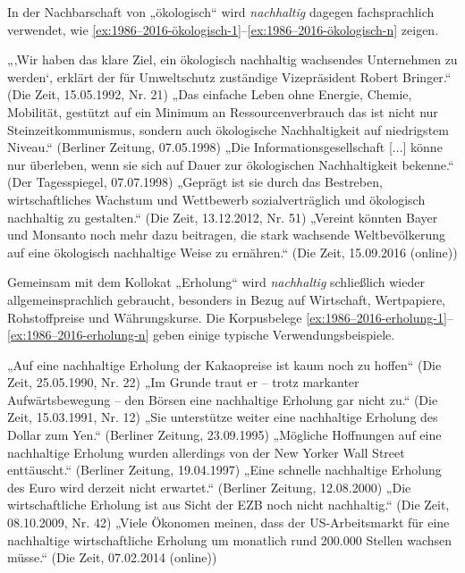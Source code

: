 \documentclass[
    german,
    a4paper,%
    12pt,%
    oneside,%
    toc=bibliography,
    final,
]{scrartcl}
\begin{document}
In der Nachbarschaft von „ökologisch“ wird \textit{nachhaltig} dagegen fachsprachlich verwendet, wie \ref{ex:1986–2016-ökologisch-1}–\ref{ex:1986–2016-ökologisch-n} zeigen.

\begin{exe}
\ex\label{ex:1986–2016-ökologisch-1} „‚Wir haben das klare Ziel, ein ökologisch nachhaltig wachsendes Unternehmen zu werden‘, erklärt der für Umweltschutz zuständige Vizepräsident Robert Bringer.“ (Die Zeit, 15.05.1992, Nr. 21)
\ex „Das einfache Leben ohne Energie, Chemie, Mobilität, gestützt auf ein Minimum an Ressourcenverbrauch das ist nicht nur Steinzeitkommunismus, sondern auch ökologische Nachhaltigkeit auf niedrigstem Niveau.“ (Berliner Zeitung, 07.05.1998)
\ex „Die Informationsgesellschaft [...] könne nur überleben, wenn sie sich auf Dauer zur ökologischen Nachhaltigkeit bekenne.“ (Der Tagesspiegel, 07.07.1998)
\ex „Geprägt ist sie durch das Bestreben, wirtschaftliches Wachstum und Wettbewerb sozialverträglich und ökologisch nachhaltig zu gestalten.“ (Die Zeit, 13.12.2012, Nr. 51)
\ex\label{ex:1986–2016-ökologisch-n} „Vereint könnten Bayer und Monsanto noch mehr dazu beitragen, die stark wachsende Weltbevölkerung auf eine ökologisch nachhaltige Weise zu ernähren.“ (Die Zeit, 15.09.2016 (online))
\end{exe}

Gemeinsam mit dem Kollokat „Erholung“ wird \textit{nachhaltig} schließlich wieder allgemeinsprachlich gebraucht, besonders in Bezug auf Wirtschaft, Wertpapiere, Rohstoffpreise und Währungskurse. Die Korpusbelege \ref{ex:1986–2016-erholung-1}–\ref{ex:1986–2016-erholung-n} geben einige typische Verwendungsbeispiele.

\begin{exe}
\ex\label{ex:1986–2016-erholung-1} „Auf eine nachhaltige Erholung der Kakaopreise ist kaum noch zu hoffen“ (Die Zeit, 25.05.1990, Nr. 22)
\ex „Im Grunde traut er – trotz markanter Aufwärtsbewegung – den Börsen eine nachhaltige Erholung gar nicht zu.“ (Die Zeit, 15.03.1991, Nr. 12)
\ex „Sie unterstütze weiter eine nachhaltige Erholung des Dollar zum Yen.“ (Berliner Zeitung, 23.09.1995)
\ex „Mögliche Hoffnungen auf eine nachhaltige Erholung wurden allerdings von der New Yorker Wall Street enttäuscht.“ (Berliner Zeitung, 19.04.1997)
\ex „Eine schnelle nachhaltige Erholung des Euro wird derzeit nicht erwartet.“ (Berliner Zeitung, 12.08.2000)
\ex „Die wirtschaftliche Erholung ist aus Sicht der EZB noch nicht nachhaltig.“ (Die Zeit, 08.10.2009, Nr. 42)
\ex\label{ex:1986–2016-erholung-n} „Viele Ökonomen meinen, dass der US-Arbeitsmarkt für eine nachhaltige wirtschaftliche Erholung um monatlich rund 200.000 Stellen wachsen müsse.“ (Die Zeit, 07.02.2014 (online))
\end{exe}
\end{document}
